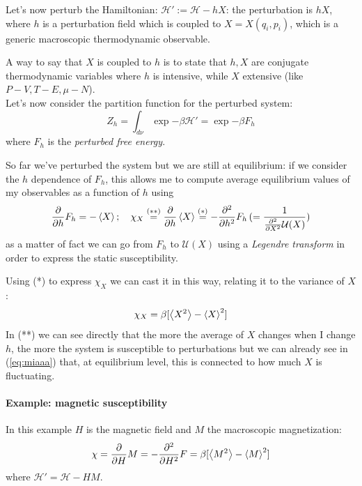 \documentclass[\main/main.tex]{subfiles}
\begin{document}
Let's now perturb the Hamiltonian: $\mathcal{H'}:=\mathcal{H}-hX$: the perturbation is $hX$, where $h$ is a perturbation field which is coupled to $X=X(q_i,p_i)$, which is a generic macroscopic thermodynamic observable. 

A way to say that $X$ is coupled to $h$ is to state that $h,X$ are conjugate thermodynamic variables where $h$ is intensive, while $X$ extensive (like $P-V, T-E, \mu-N$). \\

Let's now consider the partition function for the perturbed system:
\begin{equation}
    Z_h=\int_{d\nu}\exp{-\beta\mathcal{H'}}=\exp{-\beta F_{h}}
\end{equation}
where $F_h$ is the \textit{perturbed free energy}.

So far we've perturbed the system but we are still at equilibrium: if we consider the $h$ dependence of $F_h$, this allows me to compute average equilibrium values of my observables as a function of $h$ using 
\begin{equation}
    \frac{\partial}{\partial h}F_h=-\left\langle X \right\rangle; \quad \chi_X\overset{(**)}{=}\frac{\partial}{\partial h}\left\langle X \right\rangle\overset{(*)}{=}-\frac{\partial^2}{\partial h ^2}F_{h}\, (= \frac{1}{\frac{\partial^2}{\partial X ^2}\mathcal{U}(X)})
\end{equation}
as a matter of fact we can go from $F_h$ to $\mathcal{U}(X)$ using a \textit{Legendre transform} in order to express the static susceptibility.

Using (*) to express $\chi_X$ we can cast it in this way,  relating it to the variance of $X$:
\begin{equation}
    \chi_X=\beta[\left\langle X^2 \right\rangle-\left\langle X \right\rangle^2]
    \label{eq:miaaa}
\end{equation}
In (**) we can see directly that the more the average of $X$ changes when I change $h$, the more the system is susceptible to perturbations but we can already see in (\ref{eq:miaaa}) that, at equilibrium level, this is connected to how much $X$ is fluctuating. 

\paragraph{Example: magnetic susceptibility} In this example $H$ is the magnetic field and $M$ the macroscopic magnetization:
\begin{align}
    \chi=\frac{\partial}{\partial H}M=-\frac{\partial^2}{\partial H ^2}F=\beta[\left\langle M^2 \right\rangle-\left\langle M \right\rangle^2]
\end{align}
where $\mathcal{H'}=\mathcal{H}-HM$.
\end{document}
